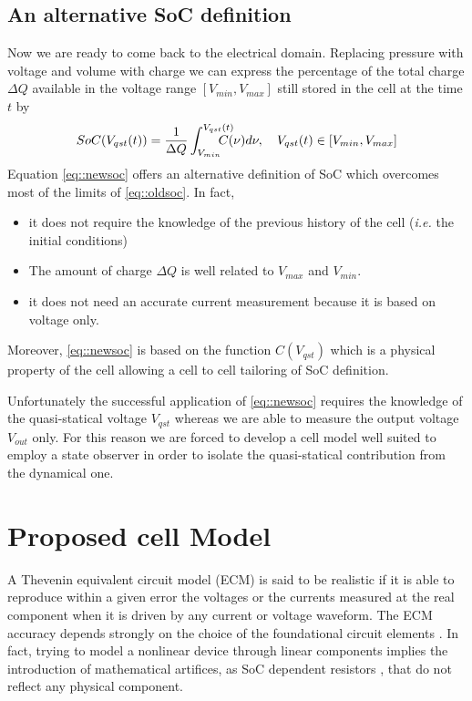 \documentclass[journal]{IEEEtran}
\begin{document}
\subsection{An alternative SoC definition}
Now we are ready to come back to the electrical domain. Replacing pressure with voltage and volume with charge we can express the percentage of the total charge $\Delta Q$ available in the voltage range $[V_{min},V_{max}]$ still stored in the cell at the time $t$ by
\begin{equation}
SoC(V_{qst}(t))=\frac{1}{\Delta Q}\int_{V_{min}}^{V_{qst}(t)}\hspace{-0.5cm}C(\nu)d\nu, \quad V_{qst}(t) \in [V_{min},V_{max}]
\label{eq::newsoc}
\end{equation}
Equation \eqref{eq::newsoc} offers an alternative definition of SoC which overcomes most of the limits of \eqref{eq::oldsoc}. In fact, 
\begin{itemize}
\item it does not require the knowledge of the previous history of the cell (\textit{i.e.} the initial conditions)
\item The amount of charge $\Delta Q$ is well related to $V_{max}$ and $V_{min}$.
\item it does not need an accurate current measurement because it is based on voltage only.
\end{itemize}
Moreover, \eqref{eq::newsoc} is based on the function $C(V_{qst})$ which is a physical property of the cell allowing a cell to cell tailoring of SoC definition.

Unfortunately the successful application of \eqref{eq::newsoc} requires the knowledge of the quasi-statical voltage $V_{qst}$ whereas we are able to measure the output voltage $V_{out}$ only.
For this reason we are forced to develop a cell model well suited to employ a state observer in order to isolate the quasi-statical contribution from the dynamical one. 
\section{Proposed cell Model}
\label{sec::model}
A Thevenin equivalent circuit model (ECM) is said to be realistic if it is able to reproduce within a given error the voltages or the currents measured at the real component when it is driven by any current or voltage waveform. The ECM accuracy depends strongly on the choice of the foundational circuit elements \cite{Chua_2003}. 
In fact, trying to model a nonlinear device through linear components implies the introduction of mathematical artifices, as SoC dependent resistors \cite{Huria_2014, Rahmoun_2012, He_2011}, that do not reflect any physical component.
\end{document}

